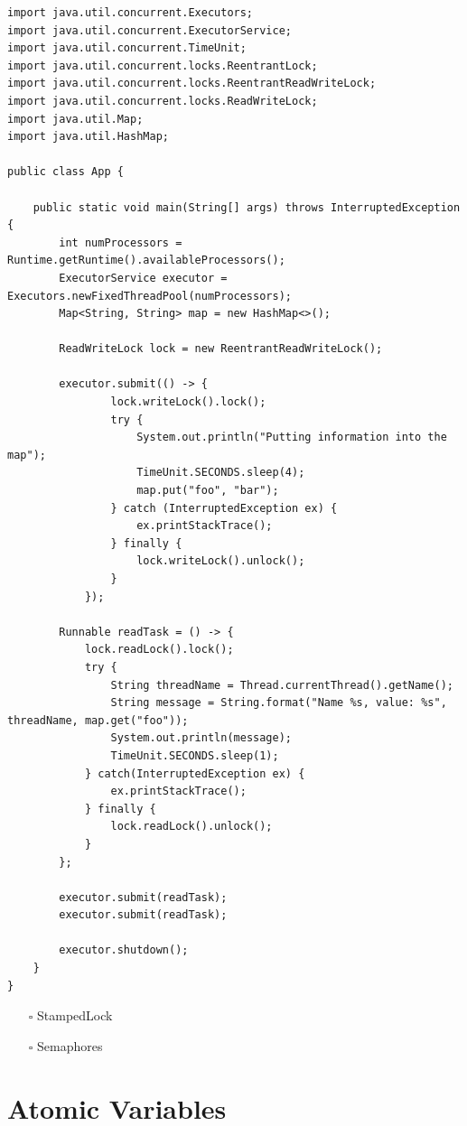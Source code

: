 \documentclass[openany, a4paper]{book}
\theoremstyle{break}
\theoremstyle{example}
\theoremstyle{note}
\theoremstyle{break}
\theoremstyle{exercise}
\begin{document}
\begin{verbatim}
import java.util.concurrent.Executors;
import java.util.concurrent.ExecutorService;
import java.util.concurrent.TimeUnit;
import java.util.concurrent.locks.ReentrantLock;
import java.util.concurrent.locks.ReentrantReadWriteLock;
import java.util.concurrent.locks.ReadWriteLock;
import java.util.Map;
import java.util.HashMap;

public class App {

    public static void main(String[] args) throws InterruptedException {
        int numProcessors = Runtime.getRuntime().availableProcessors();
        ExecutorService executor = Executors.newFixedThreadPool(numProcessors);
        Map<String, String> map = new HashMap<>();

        ReadWriteLock lock = new ReentrantReadWriteLock();

        executor.submit(() -> {
                lock.writeLock().lock();
                try {
                    System.out.println("Putting information into the map");
                    TimeUnit.SECONDS.sleep(4);
                    map.put("foo", "bar");
                } catch (InterruptedException ex) {
                    ex.printStackTrace();
                } finally {
                    lock.writeLock().unlock();
                }
            });

        Runnable readTask = () -> {
            lock.readLock().lock();
            try {
                String threadName = Thread.currentThread().getName();
                String message = String.format("Name %s, value: %s", threadName, map.get("foo"));
                System.out.println(message);
                TimeUnit.SECONDS.sleep(1);
            } catch(InterruptedException ex) {
                ex.printStackTrace();
            } finally {
                lock.readLock().unlock();
            }
        };

        executor.submit(readTask);
        executor.submit(readTask);

        executor.shutdown();
    }
}
\end{verbatim}

\begin{itemize}
\item[{$\square$}] StampedLock
\item[{$\square$}] Semaphores
\end{itemize}

\section{Atomic Variables}
\label{sec:org8d33c4e}
\end{document}

